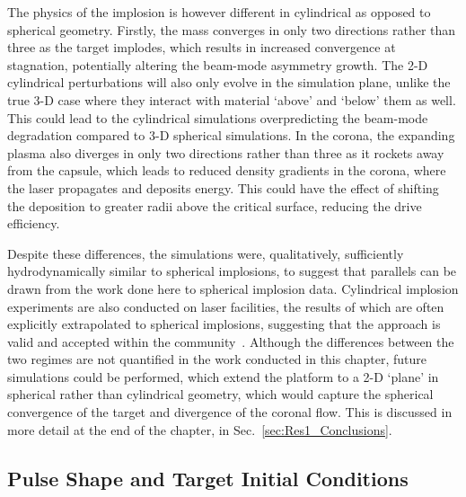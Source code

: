 The physics of the implosion is however different in cylindrical as opposed to spherical geometry.
Firstly, the mass converges in only two directions rather than three as the target implodes, which results in increased convergence at stagnation, potentially altering the beam-mode asymmetry growth.
The 2-D cylindrical perturbations will also only evolve in the simulation plane, unlike the true 3-D case where they interact with material `above' and `below' them as well.
This could lead to the cylindrical simulations overpredicting the beam-mode degradation compared to 3-D spherical simulations.
In the corona, the expanding plasma also diverges in only two directions rather than three as it rockets away from the capsule, which leads to reduced density gradients in the corona, where the laser propagates and deposits energy.
This could have the effect of shifting the deposition to greater radii above the critical surface, reducing the drive efficiency.

Despite these differences, the simulations were, qualitatively, sufficiently hydrodynamically similar to spherical implosions, to suggest that parallels can be drawn from the work done here to spherical implosion data.
Cylindrical implosion experiments are also conducted on laser facilities, the results of which are often explicitly extrapolated to spherical implosions, suggesting that the approach is valid and accepted within the community~\cite{perez-callejo_cylindrical_2022,tubbs_direct-drive_1999}.
Although the differences between the two regimes are not quantified in the work conducted in this chapter, future simulations could be performed, which extend the platform to a 2-D `plane' in spherical rather than cylindrical geometry, which would capture the spherical convergence of the target and divergence of the coronal flow.
This is discussed in more detail at the end of the chapter, in Sec.~\ref{sec:Res1_Conclusions}.

\subsection{Pulse Shape and Target Initial Conditions}%
\label{sec:Res1_initialconditions}

